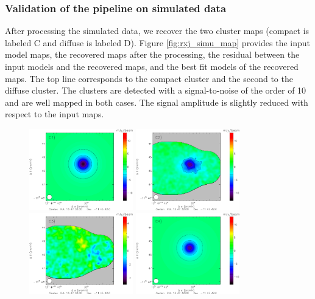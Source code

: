  \subsubsection{Validation of the pipeline on simulated data}
 \label{sec:valid_pipe_simu}
After processing the simulated data, we recover the two cluster maps (compact is labeled C and diffuse is labeled D). Figure \ref{fig:rxj_simu_map} provides the input model maps, the recovered maps after the processing, the residual between the input models and the recovered maps, and the best fit models of the recovered maps. The top line corresponds to the compact cluster and the second to the diffuse cluster. The clusters are detected with a signal-to-noise of the order of 10 and are well mapped in both cases. The signal amplitude is slightly reduced with respect to the input maps.
	\begin{figure}
	\centering
	\includegraphics[width=4.5cm]{Figure/Simulation_RXJ1347_model_compact}
	\includegraphics[width=4.5cm]{Figure/Simulation_RXJ1347_compact}
	\includegraphics[width=4.5cm]{Figure/Simulation_RXJ1347_resi_compact}
	\includegraphics[width=4.5cm]{Figure/Simulation_RXJ1347_bestfit_compact}	

\end{figure}
